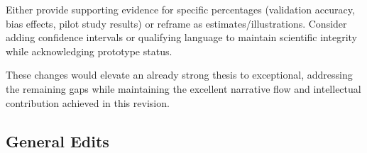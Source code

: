 \documentclass[
  11pt,
  letterpaper,
]{book}
\begin{document}
Either provide supporting evidence for specific percentages (validation
accuracy, bias effects, pilot study results) or reframe as
estimates/illustrations. Consider adding confidence intervals or
qualifying language to maintain scientific integrity while acknowledging
prototype status.

These changes would elevate an already strong thesis to exceptional,
addressing the remaining gaps while maintaining the excellent narrative
flow and intellectual contribution achieved in this revision.

\begin{landscape}

\section{General Edits}\label{general-edits}


\end{landscape}
\end{document}
